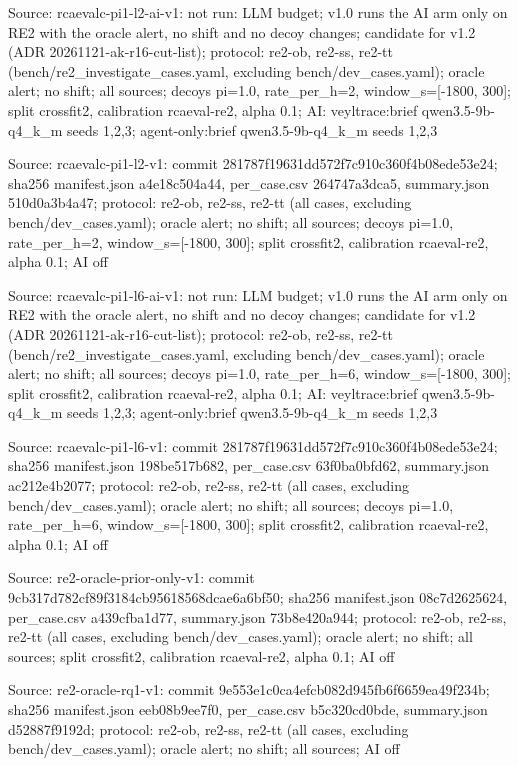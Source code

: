 \noindent Source: rcaevalc-pi1-l2-ai-v1: not run: LLM budget; v1.0 runs the AI arm only on RE2 with the oracle alert, no shift and no decoy changes; candidate for v1.2 (ADR 20261121-ak-r16-cut-list); protocol: re2-ob, re2-ss, re2-tt (bench/\allowbreak{}re2\_investigate\_cases.yaml, excluding bench/\allowbreak{}dev\_cases.yaml); oracle alert; no shift; all sources; decoys pi=1.0, rate\_per\_h=2, window\_s=[-1800, 300]; split crossfit2, calibration rcaeval-re2, alpha 0.1; AI: veyltrace:brief qwen3.5-9b-q4\_k\_m seeds 1,2,3; agent-only:brief qwen3.5-9b-q4\_k\_m seeds 1,2,3\par
\noindent Source: rcaevalc-pi1-l2-v1: commit 281787f19631dd572f7c910c360f4b08ede53e24; sha256 manifest.json a4e18c504a44, per\_case.csv 264747a3dca5, summary.json 510d0a3b4a47; protocol: re2-ob, re2-ss, re2-tt (all cases, excluding bench/\allowbreak{}dev\_cases.yaml); oracle alert; no shift; all sources; decoys pi=1.0, rate\_per\_h=2, window\_s=[-1800, 300]; split crossfit2, calibration rcaeval-re2, alpha 0.1; AI off\par
\noindent Source: rcaevalc-pi1-l6-ai-v1: not run: LLM budget; v1.0 runs the AI arm only on RE2 with the oracle alert, no shift and no decoy changes; candidate for v1.2 (ADR 20261121-ak-r16-cut-list); protocol: re2-ob, re2-ss, re2-tt (bench/\allowbreak{}re2\_investigate\_cases.yaml, excluding bench/\allowbreak{}dev\_cases.yaml); oracle alert; no shift; all sources; decoys pi=1.0, rate\_per\_h=6, window\_s=[-1800, 300]; split crossfit2, calibration rcaeval-re2, alpha 0.1; AI: veyltrace:brief qwen3.5-9b-q4\_k\_m seeds 1,2,3; agent-only:brief qwen3.5-9b-q4\_k\_m seeds 1,2,3\par
\noindent Source: rcaevalc-pi1-l6-v1: commit 281787f19631dd572f7c910c360f4b08ede53e24; sha256 manifest.json 198be517b682, per\_case.csv 63f0ba0bfd62, summary.json ac212e4b2077; protocol: re2-ob, re2-ss, re2-tt (all cases, excluding bench/\allowbreak{}dev\_cases.yaml); oracle alert; no shift; all sources; decoys pi=1.0, rate\_per\_h=6, window\_s=[-1800, 300]; split crossfit2, calibration rcaeval-re2, alpha 0.1; AI off\par
\noindent Source: re2-oracle-prior-only-v1: commit 9cb317d782cf89f3184cb95618568dcae6a6bf50; sha256 manifest.json 08c7d2625624, per\_case.csv a439cfba1d77, summary.json 73b8e420a944; protocol: re2-ob, re2-ss, re2-tt (all cases, excluding bench/\allowbreak{}dev\_cases.yaml); oracle alert; no shift; all sources; split crossfit2, calibration rcaeval-re2, alpha 0.1; AI off\par
\noindent Source: re2-oracle-rq1-v1: commit 9e553e1c0ca4efcb082d945fb6f6659ea49f234b; sha256 manifest.json eeb08b9ee7f0, per\_case.csv b5c320cd0bde, summary.json d52887f9192d; protocol: re2-ob, re2-ss, re2-tt (all cases, excluding bench/\allowbreak{}dev\_cases.yaml); oracle alert; no shift; all sources; AI off\par
